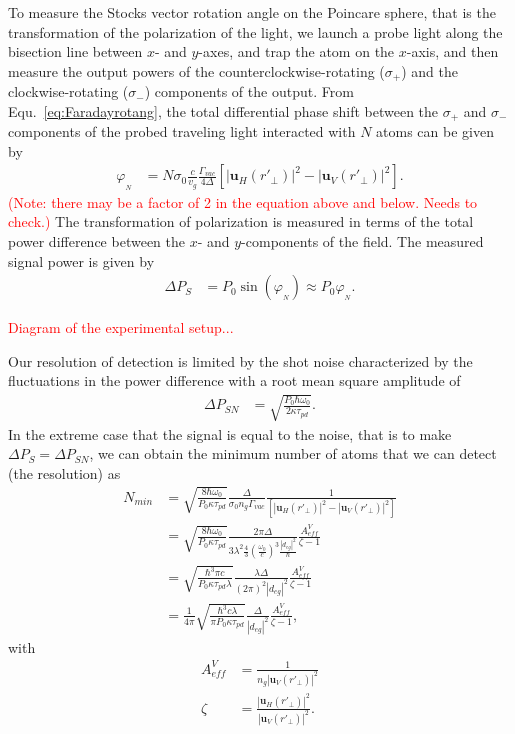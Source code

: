 \documentclass[]{report}
\begin{document}
To measure the Stocks vector rotation angle on the Poincare sphere, that is the transformation of the polarization of the light, we launch a probe light along the bisection line between $ x $- and $ y $-axes, and trap the atom on the $ x $-axis, and then measure the output powers of the counterclockwise-rotating ($ \sigma_+ $) and the clockwise-rotating ($ \sigma_- $) components of the output. From Equ.~\eqref{eq:Faradayrotang}, the total differential phase shift between the $ \sigma_+ $ and $ \sigma_- $ components of the probed traveling light interacted with $ N $ atoms can be given by
\begin{align}
\varphi_{_N} &= N\sigma_0\frac{c}{v_g}\frac{\Gamma_{vac}}{4\Delta}\left[| \mathbf{u}_H(r'_{\!\perp})|^2- | \mathbf{u}_V(r'_{\!\perp})|^2 \right].
\end{align}
\textcolor{red}{(Note: there may be a factor of 2 in the equation above and below. Needs to check.)}
The transformation of polarization is measured in terms of the total power difference between the $ x $- and $ y $-components of the field. The measured signal power is given by
\begin{align}
\Delta P_S &= P_0 \sin(\varphi_{_N}) \approx P_0 \varphi_{_N}. \label{eq:polsignal}
\end{align}

\textcolor{red}{Diagram of the experimental setup...}

Our resolution of detection is limited by the shot noise characterized by the fluctuations in the power difference with a root mean square amplitude of 
\begin{align}
\Delta P_{SN} &= \sqrt{\frac{P_0 \hbar \omega_0 }{2\kappa \tau_{pd}}}. \label{eq:shotnoise}
\end{align}
In the extreme case that the signal is equal to the noise, that is to make $ \Delta P_S=\Delta P_{SN} $, we can obtain the minimum number of atoms that we can detect (the resolution) as
\begin{align}
N_{min} &= \sqrt{\frac{8  \hbar \omega_0  }{P_0\kappa \tau_{pd}}}\frac{\Delta}{\sigma_0 n_g\Gamma_{vac}}\frac{1}{\left[| \mathbf{u}_H(r'_{\!\perp})|^2- | \mathbf{u}_V(r'_{\!\perp})|^2 \right]}\\
&=\sqrt{\frac{8  \hbar \omega_0  }{P_0\kappa \tau_{pd}}}\frac{2\pi\Delta}{3\lambda^2 \frac{4}{3} \left( \frac{\omega_0}{c}\right)^3 \frac{|d_{eg}|^2}{\hbar}}\frac{A_{e\!f\!f}^V}{\zeta -1 }\\
&= \sqrt{\frac{\hbar^3 \pi c  }{P_0\kappa \tau_{pd}\lambda}}\frac{\lambda\Delta }{  \left( 2\pi\right)^2 |d_{eg}|^2}\frac{A_{e\!f\!f}^V}{\zeta -1 }\\
&= \frac{1}{4\pi}\sqrt{\frac{\hbar^3 c \lambda }{\pi P_0\kappa \tau_{pd}}}\frac{\Delta }{   |d_{eg}|^2}\frac{A_{e\!f\!f}^V}{\zeta -1 },
\end{align}
with
\begin{align}
A_{e\!f\!f}^V &= \frac{1}{n_g| \mathbf{u}_V(r'_{\!\perp})|^2}\\
\zeta &= \frac{| \mathbf{u}_H(r'_{\!\perp})|^2}{| \mathbf{u}_V(r'_{\!\perp})|^2}.
\end{align}
\end{document}
